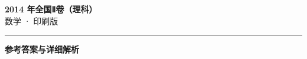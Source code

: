\documentclass[zihao=5, a4paper]{ctexart}
\begin{document}
\begin{center}
  {\Large\bfseries 2014 年全国Ⅱ卷（理科）}\\[4pt]
  {\large 数学 · 印刷版}
\end{center}
\medskip
{}

\par\bigskip\hrule\bigskip
{}
\begin{center}{\large\bfseries 参考答案与详细解析}\end{center}
\smallskip

\end{document}
